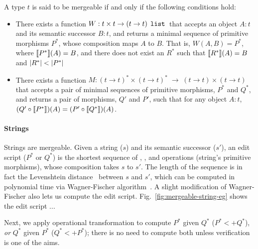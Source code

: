 \begin{definition} 
\label{def:mergeable-type-2}
A type $t$ is said to be mergeable if and only if the following
conditions hold:
\begin{itemize}
  \item There exists a function $W: t \times t \rightarrow (t
  \rightarrow t)\; \,{\tt list}\,$ that accepts an object $A:t$ and its
  semantic successor $B:t$, and returns a minimal sequence of
  primitive morphisms $P^*$, whose composition maps $A$ to $B$. That
  is, $W(A,B) = P^*$, where $\llbracket P^* \rrbracket(A) = B$, and there does not
  exist an $R^*$ such that $\llbracket R^* \rrbracket(A) = B$ and $\left|R^*\right| <
  \left|P^*\right|$

  \item There exists a function $M: (t \rightarrow t)^*\!\times\!(t
  \rightarrow t)^* \;\rightarrow\; (t \rightarrow t)\!\times\!(t
  \rightarrow t)$ that accepts a pair of minimal sequences of
  primitive morphisms, $P^*$ and $Q^*$, and returns a pair of morphisms,
  $Q'$ and $P'$, such that for any object $A:t$, $(Q' \circ
  \llbracket P^* \rrbracket)(A) = (P' \circ \llbracket Q^* \rrbracket)(A)$.  
\end{itemize}
\end{definition}

\paragraph{Strings} Strings are mergeable. Given a string ($s$) and
its semantic successor ($s'$), an edit script ($P^*$ or $Q^*$) is the
shortest sequence of , , and 
operations (string's primitive morphisms), whose composition takes $s$
to $s'$. The length of the sequence is in fact the Levenshtein
distance~\cite{levenstein} between $s$ and $s'$, which can be computed
in polynomial time via Wagner-Fischer algorithm~\cite{wagner-fischer}.
A slight modification of Wagner-Fischer also lets us compute the edit
script. Fig.~\ref{fig:mergeable-string-eg} shows the edit script ...

Next, we apply operational transformation to compute $P^*$ given $Q^*$
($P^* <+ Q^*$), \emph{or} $Q^*$ given $P^*$ ($Q^* <+ P^*$); there is
no need to compute both unless verification is one of the aims. 


\paragraph{}



